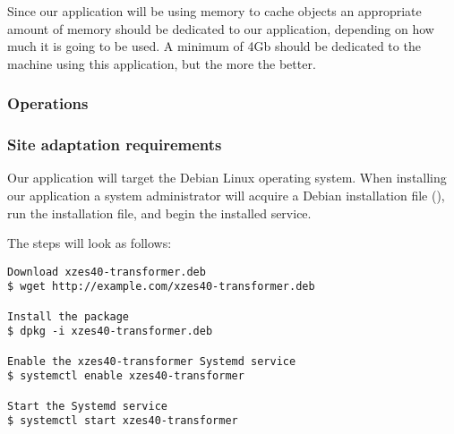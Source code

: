 Since our application will be using memory to cache objects an appropriate amount of memory should be dedicated to our application, depending on how much it is going to be used.
A minimum of 4Gb should be dedicated to the machine using this application, but the more the better.

\subsubsection{Operations}

\subsubsection{Site adaptation requirements}

Our application will target the Debian Linux operating system.
When installing our application a system administrator will acquire a Debian installation file (), run the installation file, and begin the installed service.

The steps will look as follows:
\begin{lstlisting}
Download xzes40-transformer.deb
$ wget http://example.com/xzes40-transformer.deb

Install the package
$ dpkg -i xzes40-transformer.deb

Enable the xzes40-transformer Systemd service
$ systemctl enable xzes40-transformer

Start the Systemd service
$ systemctl start xzes40-transformer
\end{lstlisting}

